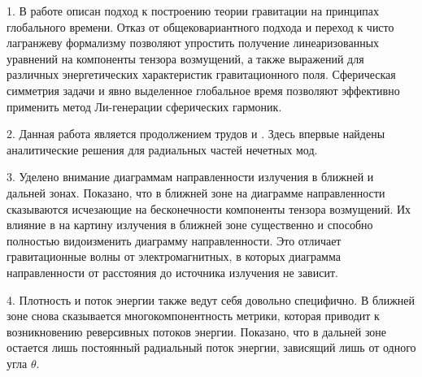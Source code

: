 \documentclass[\docroot/reports/draft/report.tex]{subfiles}
\begin{document}
\onlyinsubfile{\tableofcontents}

1. В работе описан подход к построению теории гравитации на принципах глобального времени. Отказ от общековариантного подхода и переход к чисто лагранжеву формализму позволяют упростить получение линеаризованных уравнений на компоненты тензора возмущений, а также выражений для различных энергетических характеристик гравитационного поля. Сферическая симметрия задачи и явно выделенное глобальное время позволяют эффективно применить метод Ли-генерации сферических гармоник.

2. Данная работа является продолжением трудов \cite{burlankov_space_dynamics} и \cite{burlankov_grav_waves}. Здесь впервые найдены аналитические решения для радиальных частей нечетных мод.

3. Уделено внимание диаграммам направленности излучения в ближней и дальней зонах. Показано, что в ближней зоне на диаграмме направленности сказываются исчезающие на бесконечности компоненты тензора возмущений. Их влияние в на картину излучения в ближней зоне существенно и способно полностью видоизменить диаграмму направленности. Это отличает гравитационные волны от электромагнитных, в которых диаграмма направленности от расстояния до источника излучения не зависит.

4. Плотность и поток энергии также ведут себя довольно специфично. В ближней зоне снова сказывается многокомпонентность метрики, которая приводит к возникновению реверсивных потоков энергии. Показано, что в дальней зоне остается лишь постоянный радиальный поток энергии, зависящий лишь от одного угла $\theta$.

\end{document}
